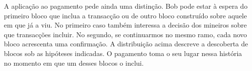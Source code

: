A aplicação ao pagamento pede ainda uma distinção. Bob pode estar à espera
do primeiro bloco que inclua a transacção ou de outro bloco construído
sobre aquele em que já a viu. No primeiro caso também interessa a decisão
dos mineiros sobre que transacções incluir. No segundo, se continuarmos no
mesmo ramo, cada novo bloco acrescenta uma confirmação. A distribuição
acima descreve a descoberta de blocos sob as hipóteses indicadas. O
pagamento toma o seu lugar nessa história no momento em que um desses blocos
o inclui.
